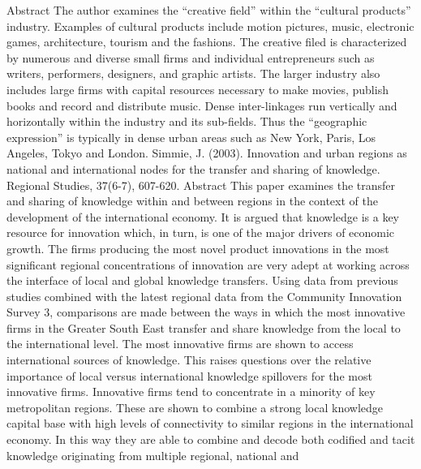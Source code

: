 \documentclass[a4paper,11pt]{article}
\begin{document}
Abstract
The author examines the “creative field” within the “cultural products” industry. Examples of cultural products include motion pictures, music, electronic games, architecture, tourism and the fashions. The creative filed is characterized by numerous and diverse small firms and individual entrepreneurs such as writers, performers, designers, and graphic artists. The larger industry also includes large firms with capital resources necessary to make movies, publish books and record and distribute music. Dense inter-linkages run vertically and horizontally within the industry and its sub-fields. Thus the “geographic expression” is typically in dense urban areas such as New York, Paris, Los Angeles, Tokyo and London.
Simmie, J. (2003). Innovation and urban regions as national and international nodes for the transfer and sharing of knowledge. Regional Studies, 37(6-7), 607-620.
Abstract
This paper examines the transfer and sharing of knowledge within and between regions in the context of the development of the international economy. It is argued that knowledge is a key resource for innovation which, in turn, is one of the major drivers of economic growth. The firms producing the most novel product innovations in the most significant regional concentrations of innovation are very adept at working across the interface of local and global knowledge transfers. Using data from previous studies combined with the latest regional data from the Community Innovation Survey 3, comparisons are made between the ways in which the most innovative firms in the Greater South East transfer and share knowledge from the local to the international level. The most innovative firms are shown to access international sources of knowledge. This raises questions over the relative importance of local versus international knowledge spillovers for the most innovative firms. Innovative firms tend to concentrate in a minority of key metropolitan regions. These are shown to combine a strong local knowledge capital base with high levels of connectivity to similar regions in the international economy. In this way they are able to combine and decode both codified and tacit knowledge originating from multiple regional, national and
 
\end{document}
